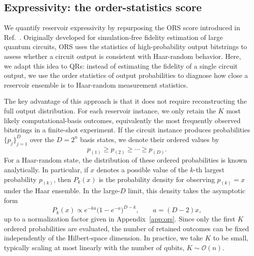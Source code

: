 \documentclass[
    aps,
    pre,
    amsmath,
    amssymb,
    reprint,
    superscriptaddress,
    preprintnumbers,
]{revtex4-2}
\begin{document}
\subsection{Expressivity: the order-statistics score}
\label{sec:methods-ors}
We quantify reservoir expressivity by repurposing the ORS score  introduced in Ref.~\cite{micklitz2025ors}. Originally developed for simulation-free fidelity estimation of large quantum circuits, ORS uses the statistics of high-probability output bitstrings to assess whether a circuit output is consistent with Haar-random behavior. Here, we adapt this idea to QRs: instead of estimating the fidelity of a single circuit output, we use the order statistics of output probabilities to diagnose how close a reservoir ensemble is to Haar-random measurement statistics.

The key advantage of this approach is that it does not require reconstructing the full output distribution. For each reservoir instance, we only retain the $K$ most likely computational-basis outcomes, equivalently the most frequently observed bitstrings in a finite-shot experiment. If the circuit instance produces probabilities $\{p_j\}_{j=1}^{D}$ over the $D=2^n$ basis states, we denote their ordered values by
\begin{equation*}
    p_{(1)} \geq p_{(2)} \geq \cdots \geq p_{(D)} .
\end{equation*}
For a Haar-random state, the distribution of these ordered probabilities is known analytically. In particular, if $x$ denotes a possible value of the $k$-th largest probability $p_{(k)}$, then $P_k(x)$ is the probability density for observing $p_{(k)}=x$ under the Haar ensemble. In the large-$D$ limit, this density takes the asymptotic form
\begin{equation}
    P_k(x) \propto e^{-k a}\bigl(1-e^{-a}\bigr)^{D-k},
\qquad a=(D-2)x,
\end{equation}
up to a normalization factor given in Appendix~\ref{app:ors}. Since only the first $K$ ordered probabilities are evaluated, the number of retained outcomes can be fixed independently of the Hilbert-space dimension. In practice, we take $K$ to be small, typically scaling at most linearly with the number of qubits, $K\sim\mathcal{O}(n)$.
\end{document}
